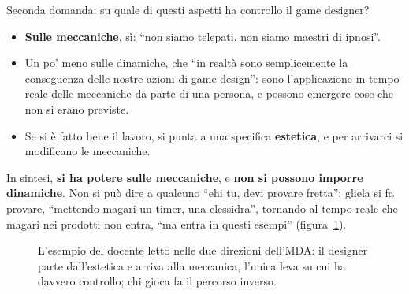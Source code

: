 Seconda domanda: su quale di questi aspetti ha controllo il game designer?
\begin{itemize}
  \item \textbf{Sulle meccaniche}, sì: ``non siamo telepati, non siamo maestri di
        ipnosi''.
  \item Un po' meno sulle dinamiche, che ``in realtà sono semplicemente la
        conseguenza delle nostre azioni di game design'': sono l'applicazione in
        tempo reale delle meccaniche da parte di una persona, e possono emergere
        cose che non si erano previste.
  \item Se si è fatto bene il lavoro, si punta a una specifica
        \textbf{estetica}, e per arrivarci si modificano le meccaniche.
\end{itemize}
In sintesi, \textbf{si ha potere sulle meccaniche}, e \textbf{non si possono
imporre dinamiche}. Non si può dire a qualcuno ``ehi tu, devi provare fretta'':
gliela si fa provare, ``mettendo magari un timer, una clessidra'', tornando al
tempo reale che magari nei prodotti non entra, ``ma entra in questi esempi''
(figura~\ref{a3:fig:mda-adrenalina}).

\begin{figure}[htbp]
\centering
{}
\caption{L'esempio del docente letto nelle due direzioni dell'MDA: il designer
parte dall'estetica e arriva alla meccanica, l'unica leva su cui ha davvero
controllo; chi gioca fa il percorso inverso.}
\label{a3:fig:mda-adrenalina}
\end{figure}

